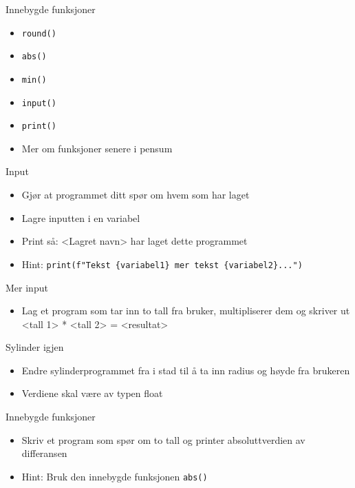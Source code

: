 \documentclass[screen, aspectratio=169]{beamer}
\begin{document}
\begin{frame}[fragile]{Innebygde funksjoner}
	\begin{itemize}
		\item \lstinline|round()|
		\item \lstinline|abs()|
		\item \lstinline|min()|
		\item \lstinline|input()|
		\item \lstinline|print()|
		\vspace{1em}
		\item Mer om funksjoner senere i pensum
	\end{itemize}
\end{frame}

\begin{frame}[fragile]{Input}
	\begin{itemize}
		\item Gjør at programmet ditt spør om hvem som har laget
		\item Lagre inputten i en variabel
		\item Print så: <Lagret navn> har laget dette programmet
		\vspace{1em}
		\item Hint: \lstinline|print(f"Tekst {variabel1} mer tekst {variabel2}...")|
	\end{itemize}
\end{frame}

\begin{frame}{Mer input}
	\begin{itemize}
		\item Lag et program som tar inn to tall fra bruker, multipliserer dem og skriver ut <tall 1> * <tall 2> = <resultat>
	\end{itemize}
\end{frame}

\begin{frame}{Sylinder igjen}
	\begin{itemize}
		\item Endre sylinderprogrammet fra i stad til å ta inn radius og høyde fra brukeren
		\item Verdiene skal være av typen float
	\end{itemize}
\end{frame}

\begin{frame}[fragile]{Innebygde funksjoner}
	\begin{itemize}
		\item Skriv et program som spør om to tall og printer absoluttverdien av differansen
		\item Hint: Bruk den innebygde funksjonen \lstinline|abs()|
	\end{itemize}
\end{frame}
\end{document}
